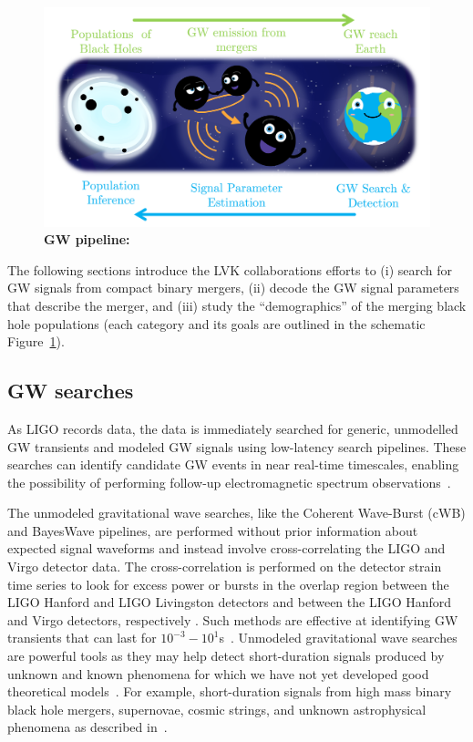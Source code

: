 \begin{figure}
\begin{center}
  \centerline{\includegraphics[width=1.1\linewidth]{src/figures/gw_pipeline.png}}
  \caption{\textbf{GW pipeline:}  }
  \label{fig:gw_pipeline}
\end{center}
\end{figure}

The following sections introduce the LVK collaborations efforts to (i) search for GW signals from compact binary mergers, (ii) decode the GW signal parameters that describe the merger, and (iii) study the ``demographics'' of the merging black hole populations (each category and its goals are outlined in the schematic Figure~\ref{fig:gw_pipeline}).


\subsection{GW searches}  \label{sec:searches}

As LIGO records data, the data is immediately searched for generic, unmodelled GW transients and modeled GW signals using low-latency search pipelines. 
These searches can identify candidate GW events in near real-time timescales, enabling the possibility of performing follow-up electromagnetic spectrum observations~\cite{abbott2018prospects}.

The unmodeled gravitational wave searches, like the Coherent Wave-Burst (cWB) and BayesWave pipelines, are performed without prior information about expected signal waveforms and instead involve cross-correlating the LIGO and Virgo detector data. 
The cross-correlation is performed on the detector strain time series to look for excess power or bursts in the overlap region between the LIGO Hanford and LIGO Livingston detectors and between the LIGO Hanford and Virgo detectors, respectively \cite{LSC:2016}. 
Such methods are effective at identifying GW transients that can last for
$10^{-3}-10^{1}$s~\cite{abbott2016observing}. 
Unmodeled gravitational wave searches are powerful tools as they may help detect short-duration signals produced by unknown and known phenomena for which we have not yet developed good theoretical models~\cite{Abbott:2016blz}. 
For example, short-duration signals from high mass binary black hole mergers, supernovae, cosmic strings, and unknown astrophysical phenomena as described in~\citep{abbott2018prospects}.


